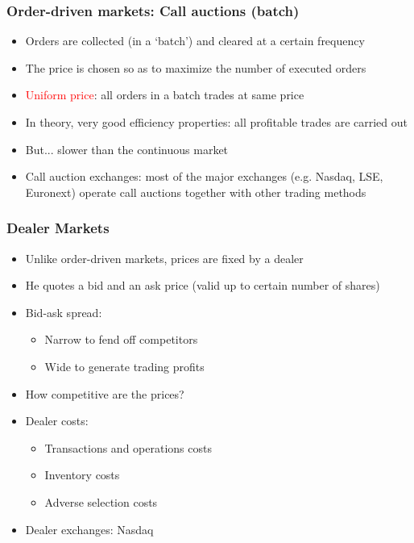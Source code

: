 \documentclass[english,10pt]{beamer}
\theoremstyle{definition}
\begin{document}
\begin{frame}
\frametitle{Order-driven markets: Call auctions (batch)}

\begin{itemize}
\item Orders are collected (in a `batch') and cleared at a certain frequency
\item The price is chosen so as to maximize the number of executed orders
\item \textcolor{red}{Uniform price}: all orders in a batch trades at same price

\item In theory,  very good efficiency properties: all profitable trades are carried out

\item But... slower than the continuous market

\item Call auction exchanges: most of the major exchanges (e.g. Nasdaq, LSE, Euronext) operate call auctions together with other trading methods


\end{itemize}

\end{frame}


\begin{frame}
\frametitle{Dealer Markets}

\begin{itemize}
\item Unlike order-driven markets, prices are fixed by a dealer
\item He quotes a bid and an ask price (valid up to certain number of shares)
\item Bid-ask spread:
\begin{itemize}
\item Narrow to fend off competitors
\item Wide to generate trading profits
\end{itemize}

\item How competitive are the prices?

\item Dealer costs:

\begin{itemize}
\item Transactions and operations costs
\item Inventory costs
\item Adverse selection costs
\end{itemize}

\item Dealer exchanges: Nasdaq

\end{itemize}

\end{frame}
\end{document}
